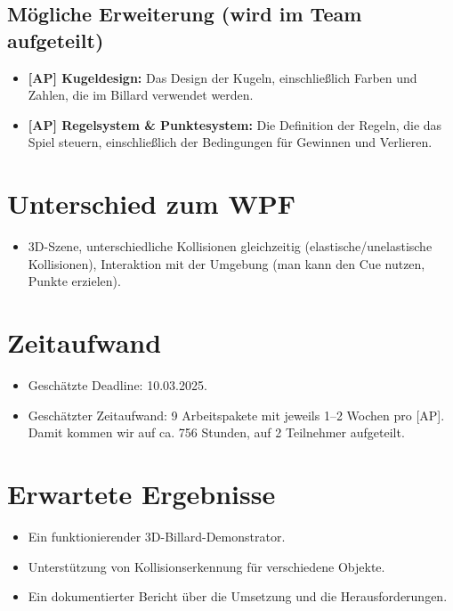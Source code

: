 \documentclass[11pt,a4paper]{article}
\begin{document}
\subsection*{Mögliche Erweiterung (wird im Team aufgeteilt)}
\begin{itemize}
	
	\item \textbf{[AP] Kugeldesign:} Das Design der Kugeln, einschließlich Farben und Zahlen, die im Billard verwendet werden.
	\item \textbf{[AP] Regelsystem \& Punktesystem:} Die Definition der Regeln, die das Spiel steuern, einschließlich der Bedingungen für Gewinnen und Verlieren.
\end{itemize}
	\section*{Unterschied zum WPF}
\begin{itemize}
\item 3D-Szene, unterschiedliche Kollisionen gleichzeitig (elastische/unelastische Kollisionen), Interaktion mit der Umgebung (man kann den Cue nutzen, Punkte erzielen).
\end{itemize}

\section*{Zeitaufwand}
\begin{itemize}
\item Geschätzte Deadline: 10.03.2025.
\item Geschätzter Zeitaufwand: 9 Arbeitspakete mit jeweils 1–2 Wochen pro [AP]. Damit kommen wir auf ca. 756 Stunden, auf 2 Teilnehmer aufgeteilt.
\end{itemize}

	\newpage

\section*{Erwartete Ergebnisse}
\begin{itemize}
	\item Ein funktionierender 3D-Billard-Demonstrator.
	\item Unterstützung von Kollisionserkennung für verschiedene Objekte.
	\item Ein dokumentierter Bericht über die Umsetzung und die Herausforderungen.
\end{itemize}
	
\end{document}
